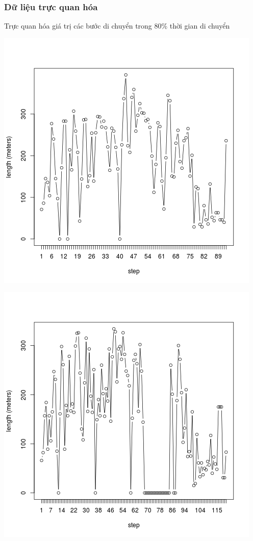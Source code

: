 \documentclass[t]{beamer}
\begin{document}

\begin{frame}[t]
\frametitle{Dữ liệu trực quan hóa}Trực quan hóa giá trị các bước di chuyển trong 80\% thời gian di chuyển\\
\begin{center}
\begin{minipage}{0.48\linewidth}
\includegraphics[width=\linewidth]{test_80_1}
\end{minipage}%
\hfill
\begin{minipage}{0.49\linewidth}
\includegraphics[width=\linewidth]{test_80_2}
\end{minipage}
\end{center}
\end{frame}
\end{document}
